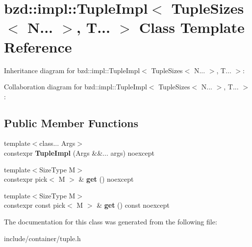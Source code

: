 \hypertarget{classbzd_1_1impl_1_1TupleImpl_3_01TupleSizes_3_01N_8_8_8_01_4_00_01T_8_8_8_01_4}{}\section{bzd\+:\+:impl\+:\+:Tuple\+Impl$<$ Tuple\+Sizes$<$ N... $>$, T... $>$ Class Template Reference}
\label{classbzd_1_1impl_1_1TupleImpl_3_01TupleSizes_3_01N_8_8_8_01_4_00_01T_8_8_8_01_4}


Inheritance diagram for bzd\+:\+:impl\+:\+:Tuple\+Impl$<$ Tuple\+Sizes$<$ N... $>$, T... $>$\+:


Collaboration diagram for bzd\+:\+:impl\+:\+:Tuple\+Impl$<$ Tuple\+Sizes$<$ N... $>$, T... $>$\+:
\subsection*{Public Member Functions}
\begin{DoxyCompactItemize}
\item 
\mbox{\label{classbzd_1_1impl_1_1TupleImpl_3_01TupleSizes_3_01N_8_8_8_01_4_00_01T_8_8_8_01_4_a03ca4c04c2900d5ea6607d77bbb93ac9}} 
{\footnotesize template$<$class... Args$>$ }\\constexpr {\bfseries Tuple\+Impl} (Args \&\&... args) noexcept
\item 
\mbox{\label{classbzd_1_1impl_1_1TupleImpl_3_01TupleSizes_3_01N_8_8_8_01_4_00_01T_8_8_8_01_4_abe2ea3ff459042818d8653fa29dc00f0}} 
{\footnotesize template$<$Size\+Type M$>$ }\\constexpr pick$<$ M $>$ \& {\bfseries get} () noexcept
\item 
\mbox{\label{classbzd_1_1impl_1_1TupleImpl_3_01TupleSizes_3_01N_8_8_8_01_4_00_01T_8_8_8_01_4_aea6b77007201b32da082fe6975484743}} 
{\footnotesize template$<$Size\+Type M$>$ }\\constexpr const pick$<$ M $>$ \& {\bfseries get} () const noexcept
\end{DoxyCompactItemize}


The documentation for this class was generated from the following file\+:\begin{DoxyCompactItemize}
\item 
include/container/tuple.\+h\end{DoxyCompactItemize}
